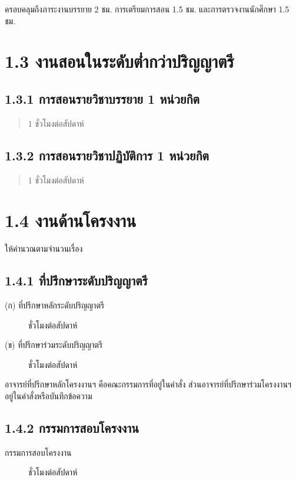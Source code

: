 \documentclass[a4paper,12pt,english]{sphinxmanual}
\begin{document}
ครอบคลุมถึงภาระงานบรรยาย 2 ชม.
การเตรียมการสอน 1.5 ชม. และการตรวจงานนักศึกษา 1.5 ชม.


\section{1.3 งานสอนในระดับต่ำกว่าปริญญาตรี}
\label{\detokenize{1teaching:id12}}

\subsection{1.3.1 การสอนรายวิชาบรรยาย 1 หน่วยกิต}
\label{\detokenize{1teaching:id13}}\begin{quote}

1 ชั่วโมงต่อสัปดาห์
\end{quote}


\subsection{1.3.2 การสอนรายวิชาปฏิบัติการ 1 หน่วยกิต}
\label{\detokenize{1teaching:id14}}\begin{quote}

1 ชั่วโมงต่อสัปดาห์
\end{quote}


\section{1.4 งานด้านโครงงาน}
\label{\detokenize{1teaching:id15}}
ให้คำนวณตามจำนวนเรื่อง


\subsection{1.4.1 ที่ปรึกษาระดับปริญญาตรี}
\label{\detokenize{1teaching:id16}}\begin{description}
\item[{(ก) ที่ปรึกษาหลักระดับปริญญาตรี}]  ชั่วโมงต่อสัปดาห์

\item[{(ข) ที่ปรึกษาร่วมระดับปริญญาตรี}]  ชั่วโมงต่อสัปดาห์

\end{description}

อาจารย์ที่ปรึกษาหลักโครงงานฯ คือคณะกรรมการที่อยู่ในคำสั่ง ส่วนอาจารย์ที่ปรึกษาร่วมโครงงานฯ อยู่ในคำสั่งหรือบันทึกข้อความ


\subsection{1.4.2 กรรมการสอบโครงงาน}
\label{\detokenize{1teaching:id17}}\begin{description}
\item[{กรรมการสอบโครงงาน}]  ชั่วโมงต่อสัปดาห์

\end{description}
\end{document}
